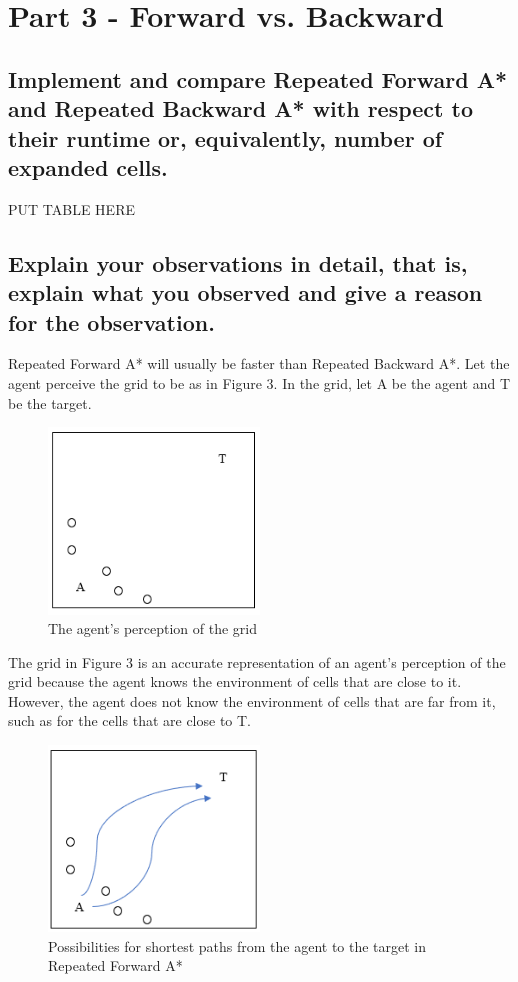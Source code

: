\documentclass{article}
\begin{document}

\section{Part 3 - Forward vs. Backward}

\subsection{Implement and compare Repeated Forward A* and Repeated Backward A* with respect to their runtime or, equivalently, number of expanded cells. }
PUT TABLE HERE
\subsection{Explain your observations in detail, that is, explain what you observed and give a reason for the observation.}
Repeated Forward A* will usually be faster than Repeated Backward A*. Let the agent perceive the grid to be as in Figure 3. In the grid, let A be the agent and T be the target.

\begin{figure}[h!]
  \includegraphics[width=0.5\textwidth]{p3_0.png}
  \caption{The agent's perception of the grid }
\end{figure}

The grid in Figure 3 is an accurate representation of an agent's perception of the grid because the agent knows the environment of cells that are close to it. However, the agent does not know the environment of cells that are far from it, such as for the cells that are close to T.

\begin{figure}[h!]
  \includegraphics[width=0.5\textwidth]{p3_1.png}
  \caption{Possibilities for shortest paths from the agent to the target in Repeated Forward A*}
\end{figure}
\end{document}

